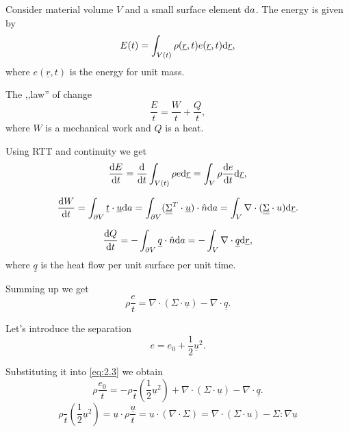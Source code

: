 \documentclass[11pt,oneside]{book}
\renewcommand{\vec}[1]{\underline{#1}}
\theoremstyle{definition} %
\theoremstyle{plain} %
\theoremstyle{remark} %
\theoremstyle{underline}
\begin{document}
  Consider material volume $V$ and a small surface element $\mathrm{d} a$.
  The energy is given by 
  \begin{displaymath}
    E(t) = \int_{V (t)} \rho (\vec r ,t ) e (\vec r, t) \d \vec r ,
  \end{displaymath}
  where $e (\vec r, t)$ is the energy for unit mass.

  The ,,law'' of change
  \begin{displaymath}
    \dfrac{E}{t} = \dfrac{W}{t} + \dfrac{Q}{t},
  \end{displaymath}
  where $W$ is a mechanical work and $Q$ is a heat.

  Using RTT and continuity we get
  \begin{displaymath}
    \dfrac{E}{t} = \dfrac{}{t} \int_{V(t)} \rho e \d \vec r = \int_V \rho \dfrac{e}{t} \d \vec r,
  \end{displaymath}
  
  \begin{displaymath}
    \dfrac{W}{t} = \int_{\partial V } \vec t \cdot \vec u \d a 
    = \int_{\partial V} (\ten \Sigma^T \cdot \vec u ) \cdot \hat n  \d a 
    = \int_V \nabla \cdot ( \ten \Sigma \cdot u) \d \vec r.
  \end{displaymath}

  \begin{displaymath}
    \dfrac{Q}{t} = - \int_{\partial V} \vec q \cdot  \hat n \d a = - \int_V \nabla \cdot \vec q \d \vec r,
  \end{displaymath}
  where $\vec q$ is the heat flow per unit surface per unit time. %

  Summing up we get
  \begin{equation}
    \rho \dfrac{ e}{t} = \nabla \cdot ( \Sigma \cdot \vec u) - \nabla \cdot \vec q.
    \label{eq:2.3}
  \end{equation}

  Let's introduce the separation 
  \begin{displaymath}
    e = e_0 + \frac{1}{2} \vec u^2.
  \end{displaymath}

  Substituting it into \ref{eq:2.3} we obtain
  \begin{displaymath}
    \rho \dfrac{e_0}{t} = - \rho \dfrac{}{t} \left( \frac{1}{2} \vec u^2 \right) + \nabla \cdot (\Sigma \cdot \vec u ) - \nabla \cdot \vec q.
  \end{displaymath}
  \begin{displaymath}
    \rho \dfrac{}{t} \left( \frac{1}{2} \vec u ^2  \right) 
    = \vec u \cdot \rho \dfrac{\vec u}{t} 
    = \vec u \cdot ( \nabla \cdot \Sigma) 
    = \nabla \cdot ( \Sigma \cdot u) - \Sigma :\nabla \vec u %
  \end{displaymath}
  
\end{document}
